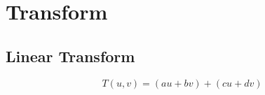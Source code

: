 \section{Transform}

  \subsection{Linear Transform}

    \begin{equation}
      T\left( u, v \right) = \left( au + bv \right) + \left( cu + dv \right)
    \end{equation}